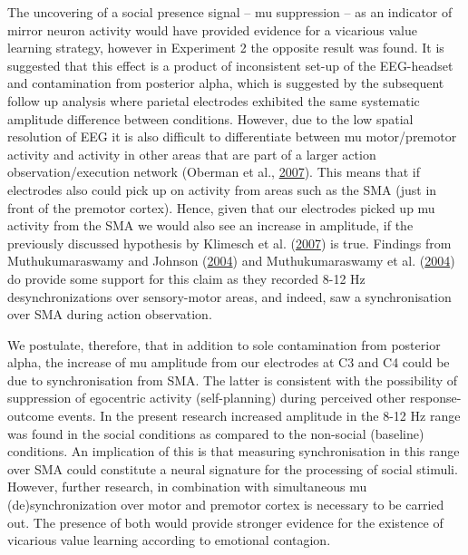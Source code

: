 \documentclass[]{elsarticle} %
\begin{document}
The uncovering of a social presence signal -- mu suppression -- as an
indicator of mirror neuron activity would have provided evidence for a
vicarious value learning strategy, however in Experiment 2 the opposite
result was found. It is suggested that this effect is a product of
inconsistent set-up of the EEG-headset and contamination from posterior
alpha, which is suggested by the subsequent follow up analysis where
parietal electrodes exhibited the same systematic amplitude difference
between conditions. However, due to the low spatial resolution of EEG it
is also difficult to differentiate between mu motor/premotor activity
and activity in other areas that are part of a larger action
observation/execution network (Oberman et al.,
\protect\hyperlink{ref-oberman2007human}{2007}). This means that if
electrodes also could pick up on activity from areas such as the SMA
(just in front of the premotor cortex). Hence, given that our electrodes
picked up mu activity from the SMA we would also see an increase in
amplitude, if the previously discussed hypothesis by Klimesch et al.
(\protect\hyperlink{ref-klimesch2007eeg}{2007}) is true. Findings from
Muthukumaraswamy and Johnson
(\protect\hyperlink{ref-muthukumaraswamy2004changes}{2004}) and
Muthukumaraswamy et al.
(\protect\hyperlink{ref-muthukumaraswamy2004mu}{2004}) do provide some
support for this claim as they recorded 8-12 Hz desynchronizations over
sensory-motor areas, and indeed, saw a synchronisation over SMA during
action observation.

We postulate, therefore, that in addition to sole contamination from
posterior alpha, the increase of mu amplitude from our electrodes at C3
and C4 could be due to synchronisation from SMA. The latter is
consistent with the possibility of suppression of egocentric activity
(self-planning) during perceived other response-outcome events. In the
present research increased amplitude in the 8-12 Hz range was found in
the social conditions as compared to the non-social (baseline)
conditions. An implication of this is that measuring synchronisation in
this range over SMA could constitute a neural signature for the
processing of social stimuli. However, further research, in combination
with simultaneous mu (de)synchronization over motor and premotor cortex
is necessary to be carried out. The presence of both would provide
stronger evidence for the existence of vicarious value learning
according to emotional contagion.
\end{document}
